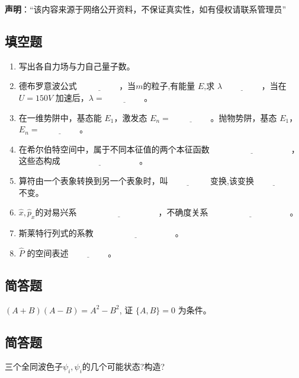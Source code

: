 
\textbf{声明}：“该内容来源于网络公开资料，不保证真实性，如有侵权请联系管理员”

\subsection{填空题}
\begin{enumerate}
    \item 写出各自力场与力自己量子数。
    \item 德布罗意波公式 $\underline{\hspace{2cm}}$，当$m$的粒子,有能量 $E$,求 $\lambda\underline{\hspace{2cm}}$，当在 $U = 150V$ 加速后，$\lambda = \underline{\hspace{2cm}}$。
    \item 在一维势阱中，基态能 $E_1$，激发态 $E_n = \underline{\hspace{2cm}}$。抛物势阱，基态 $E_1$，$E_n = \underline{\hspace{2cm}}$。
    \item 在希尔伯特空间中，属于不同本征值的两个本征函数 $\underline{\hspace{4cm}}$，这些态构成$\underline{\hspace{4cm}}$。
    \item 算符由一个表象转换到另一个表象时，叫$\underline{\hspace{2cm}}$ 变换,该变换$\underline{\hspace{2cm}}$ 不变。
    \item $\hat x,\hat p_x$的对易兴系 $\underline{\hspace{4cm}}$，不确度关系 $\underline{\hspace{4cm}}$。
    \item 斯莱特行列式的系教 $\underline{\hspace{4cm}}$。
    \item $\hat P$ 的空间表述$\underline{\hspace{2cm}}$。
\end{enumerate}
\subsection{简答题}
 $(A+B)(A-B) = A^2 - B^2$, 证 $\{A, B\} = 0$ 为条件。
\subsection{简答题}
三个全同波色子$\psi_i,\psi_i$的几个可能状态?构造?
